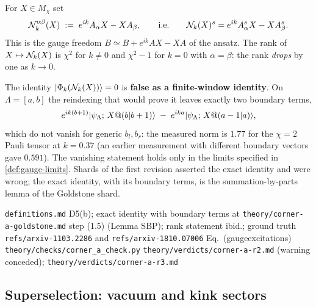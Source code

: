 \begin{definition}
\label{def:null-directions}
For $X \in M_{\chi}$ set
\begin{equation}
  \mathcal{N}_{k}^{\alpha\beta}(X) \; := \; e^{ik} A_{\alpha} X - X A_{\beta},
  \qquad\text{i.e.}\qquad
  \mathcal{N}_{k}(X)^{s} = e^{ik} A_{\alpha}^{s} X - X A_{\beta}^{s} .
  \label{eq:null-directions}
\end{equation}
This is the gauge freedom $B \simeq B + e^{ik} A X - X A$ of the ansatz.
The rank of $X \mapsto \mathcal{N}_{k}(X)$ is $\chi^{2}$ for $k \neq 0$ and
$\chi^{2} - 1$ for $k = 0$ with $\alpha = \beta$: the rank \emph{drops} by one
as $k \to 0$.
\end{definition}

\begin{remark}
\label{rem:null-not-exact}
The identity $|\Phi_{k}(\mathcal{N}_{k}(X))\rangle = 0$ is \textbf{false as a
finite-window identity}. On $\Lambda = [a,b]$ the reindexing that would prove
it leaves exactly two boundary terms,
\begin{equation}
  e^{ik(b+1)} |\psi_{\Lambda}; \, X@(b|b+1)\rangle
  \; - \; e^{ika} |\psi_{\Lambda}; \, X@(a-1|a)\rangle ,
  \label{eq:null-boundary-terms}
\end{equation}
which do not vanish for generic $b_{l}, b_{r}$: the measured norm is $1.77$ for
the $\chi = 2$ Pauli tensor at $k = 0.37$ (an earlier measurement with
different boundary vectors gave $0.591$). The vanishing statement holds only
in the limits specified in \cref{def:gauge-limits}. Shards of the first
revision asserted the exact identity and were wrong; the exact identity, with
its boundary terms, is the summation-by-parts lemma of the Goldstone shard.
\end{remark}

%
{\texttt{definitions.md} D5(b); exact identity with boundary terms at
 \texttt{theory/corner-a-goldstone.md} step (1.5) (Lemma SBP); rank statement
 ibid.; ground truth \texttt{refs/arxiv-1103.2286} and
 \texttt{refs/arxiv-1810.07006} Eq.~(gaugeexcitations)}%
{\texttt{theory/checks/corner\_a\_check.py}}%
{\texttt{theory/verdicts/corner-a-r2.md} (warning conceded);
 \texttt{theory/verdicts/corner-a-r3.md}}

\subsection{Superselection: vacuum and kink sectors}


